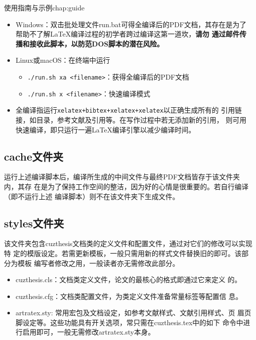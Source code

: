 \begin{cuzchapter}{使用指南与示例}{chap:guide}
    \begin{itemize}
        \item Windows：双击批处理文件run.bat可得全编译后的PDF文档，其存在是为了
              帮助不了解\LaTeX{}编译过程的初学者跨过编译这第一道坎，\textbf{请勿
                  通过邮件传播和接收此脚本，以防范DOS脚本的潜在风险。}
        \item Linux或macOS：在终端中运行
              \begin{itemize}
                  \item \verb|./run.sh xa <filename>|：获得全编译后的PDF文档
                  \item \verb|./run.sh x <filename>|：快速编译模式
              \end{itemize}
        \item 全编译指运行\verb|xelatex+bibtex+xelatex+xelatex|以正确生成所有的
              引用链接，如目录，参考文献及引用等。在写作过程中若无添加新的引用，
              则可用快速编译，即只运行一遍\LaTeX{}编译引擎以减少编译时间。
    \end{itemize}

    \subsection{cache文件夹}\label{sub:cache}

    运行上述编译脚本后，编译所生成的中间文件与最终PDF文档皆存于该文件夹内，其存
    在是为了保持工作空间的整洁，因为好的心情是很重要的。若自行编译（即不运行上述
    编译脚本）则不在该文件夹下生成文件。

    \subsection{styles文件夹}\label{sub:styles}

    该文件夹包含cuzthesis文档类的定义文件和配置文件，通过对它们的修改可以实现特
    定的模版设定。若需更新模板，一般只需用新的样式文件替换旧的即可。该部分为模板
    编写者修改之用，一般读者亦无需修改此部分。

    \begin{itemize}
        \item cuzthesis.cls：文档类定义文件，论文的最核心的格式即通过它来定义
              的。
        \item cuzthesis.cfg：文档类配置文件，为类定义文件准备常量标签等配置信
              息。
        \item artratex.sty: 常用宏包及文档设定，如参考文献样式、文献引用样式、页
              眉页脚设定等。这些功能具有开关选项，常只需在cuzthesis.tex中的如下
              命令中进行启用即可，一般无需修改artratex.sty本身。


\end{itemize}
\end{cuzchapter}
